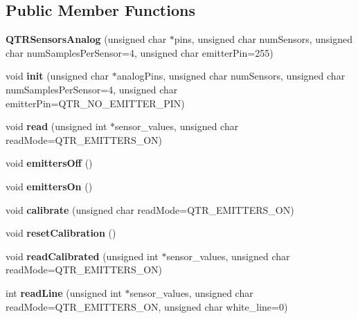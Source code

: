 \subsection*{Public Member Functions}
\begin{DoxyCompactItemize}
\item 
\mbox{\label{class_q_t_r_sensors_analog_a339096d553eeae6a83e48bb8d52182f5}} 
{\bfseries Q\+T\+R\+Sensors\+Analog} (unsigned char $\ast$pins, unsigned char num\+Sensors, unsigned char num\+Samples\+Per\+Sensor=4, unsigned char emitter\+Pin=255)
\item 
\mbox{\label{class_q_t_r_sensors_analog_a98dc112c2cf9108abf3adf2c5a8ed74d}} 
void {\bfseries init} (unsigned char $\ast$analog\+Pins, unsigned char num\+Sensors, unsigned char num\+Samples\+Per\+Sensor=4, unsigned char emitter\+Pin=Q\+T\+R\+\_\+\+N\+O\+\_\+\+E\+M\+I\+T\+T\+E\+R\+\_\+\+P\+IN)
\item 
\mbox{\label{class_q_t_r_sensors_afc47e6c2608293a610e1a3acce93628b}} 
void {\bfseries read} (unsigned int $\ast$sensor\+\_\+values, unsigned char read\+Mode=Q\+T\+R\+\_\+\+E\+M\+I\+T\+T\+E\+R\+S\+\_\+\+ON)
\item 
\mbox{\label{class_q_t_r_sensors_a576f1fe1e9f2d3d2097baf79a9655134}} 
void {\bfseries emitters\+Off} ()
\item 
\mbox{\label{class_q_t_r_sensors_a79f5380ecdb324a7800a045c3506975f}} 
void {\bfseries emitters\+On} ()
\item 
\mbox{\label{class_q_t_r_sensors_ac9840e2429c7a962977057ba154c77da}} 
void {\bfseries calibrate} (unsigned char read\+Mode=Q\+T\+R\+\_\+\+E\+M\+I\+T\+T\+E\+R\+S\+\_\+\+ON)
\item 
\mbox{\label{class_q_t_r_sensors_aa840b6ef17562d41edf21ddd08e0672e}} 
void {\bfseries reset\+Calibration} ()
\item 
\mbox{\label{class_q_t_r_sensors_aa32a448ac03cd2a45d1f14f96ac4b739}} 
void {\bfseries read\+Calibrated} (unsigned int $\ast$sensor\+\_\+values, unsigned char read\+Mode=Q\+T\+R\+\_\+\+E\+M\+I\+T\+T\+E\+R\+S\+\_\+\+ON)
\item 
\mbox{\label{class_q_t_r_sensors_ac84f0b98bceae0b59d687ae82eb92718}} 
int {\bfseries read\+Line} (unsigned int $\ast$sensor\+\_\+values, unsigned char read\+Mode=Q\+T\+R\+\_\+\+E\+M\+I\+T\+T\+E\+R\+S\+\_\+\+ON, unsigned char white\+\_\+line=0)
\end{DoxyCompactItemize}
